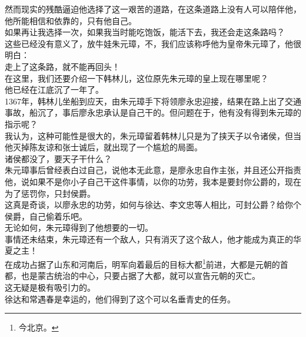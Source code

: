 \begin{multicols}{\theparacolNo}
然而现实的残酷逼迫他选择了这一艰苦的道路，在这条道路上没有人可以陪伴他，他所能相信和依靠的，只有他自己。\\

如果再让我选择一次，如果我当时能吃饱饭，能活下去，我还会走这条路吗？\\

这些已经没有意义了，放牛娃朱元璋，不，我们应该称呼他为皇帝朱元璋了，他很明白：\\

走上了这条路，就不能再回头！\\

在这里，我们还要介绍一下韩林儿，这位原先朱元璋的皇上现在哪里呢？\\

他已经在江底沉了一年了。\\

1367年，韩林儿坐船到应天，由朱元璋手下将领廖永忠迎接，结果在路上出了交通事故，船沉了，事后廖永忠承认是自己干的。但问题在于，他有没有得到朱元璋的指示呢？\\

我认为，这种可能性是很大的，朱元璋留着韩林儿只是为了挟天子以令诸侯，但当他灭掉陈友谅和张士诚后，就出现了一个尴尬的局面。\\

诸侯都没了，要天子干什么？\\

朱元璋事后曾经表白过自己，说他本无此意，是廖永忠自作主张，并且还公开指责他，说如果不是你小子自己干这件事情，以你的功劳，我本是要封你公爵的，现在为了惩罚你，只封侯爵。\\

这真是奇谈，以廖永忠的功劳，如何与徐达、李文忠等人相比，可封公爵？给你个侯爵，自己偷着乐吧。\\

无论如何，朱元璋得到了他想要的一切。\\

事情还未结束，朱元璋还有一个敌人，只有消灭了这个敌人，他才能成为真正的华夏之主！\\

在成功占据了山东和河南后，明军向着最后的目标大都\footnote{今北京。}前进，大都是元朝的首都，也是蒙古统治的中心，只要占据了大都，就可以宣告元朝的灭亡。\\

这无疑是极有吸引力的。\\

徐达和常遇春是幸运的，他们得到了这个可以名垂青史的任务。\\


\end{multicols}
